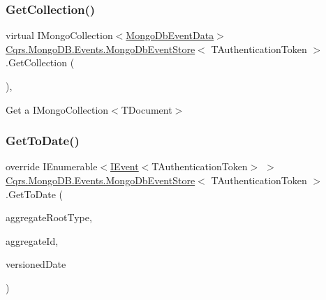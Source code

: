 \mbox{\label{classCqrs_1_1MongoDB_1_1Events_1_1MongoDbEventStore_aa6a9499aa1dcde55d82d8e0f3b5bd077_aa6a9499aa1dcde55d82d8e0f3b5bd077}} 
\subsubsection{\texorpdfstring{Get\+Collection()}{GetCollection()}}
{\footnotesize\ttfamily virtual I\+Mongo\+Collection$<$\hyperlink{classCqrs_1_1MongoDB_1_1Events_1_1MongoDbEventData}{Mongo\+Db\+Event\+Data}$>$ \hyperlink{classCqrs_1_1MongoDB_1_1Events_1_1MongoDbEventStore}{Cqrs.\+Mongo\+D\+B.\+Events.\+Mongo\+Db\+Event\+Store}$<$ T\+Authentication\+Token $>$.Get\+Collection (\begin{DoxyParamCaption}{ }\end{DoxyParamCaption})\hspace{0.3cm}{\ttfamily [protected]}, {\ttfamily [virtual]}}



Get a I\+Mongo\+Collection$<$\+T\+Document$>$ 

\mbox{\label{classCqrs_1_1MongoDB_1_1Events_1_1MongoDbEventStore_aaf78eb481e17c4a7dee0efca8a4d47bf_aaf78eb481e17c4a7dee0efca8a4d47bf}} 
\subsubsection{\texorpdfstring{Get\+To\+Date()}{GetToDate()}}
{\footnotesize\ttfamily override I\+Enumerable$<$\hyperlink{interfaceCqrs_1_1Events_1_1IEvent}{I\+Event}$<$T\+Authentication\+Token$>$ $>$ \hyperlink{classCqrs_1_1MongoDB_1_1Events_1_1MongoDbEventStore}{Cqrs.\+Mongo\+D\+B.\+Events.\+Mongo\+Db\+Event\+Store}$<$ T\+Authentication\+Token $>$.Get\+To\+Date (\begin{DoxyParamCaption}\item[{Type}]{aggregate\+Root\+Type,  }\item[{Guid}]{aggregate\+Id,  }\item[{Date\+Time}]{versioned\+Date }\end{DoxyParamCaption})\hspace{0.3cm}{\ttfamily [virtual]}}




